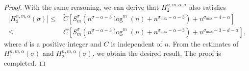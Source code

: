\documentclass[10pt]{siamltex}
\begin{document}
\begin{proof}
With the same reasoning, we can derive that ${H}_2^{n,m,\alpha,\sigma}$ also satisfies
\begin{equation*} \begin{aligned}
|{H}_2^{n,m,\alpha}(\sigma)|\leq& \widetilde{C}\left[S_m^{\sigma}\left(n^{\sigma-\alpha-3}\log^{m}(n)
+n^{\sigma_{\max}-\alpha-3}\right)+ {n}^{\sigma_{\max}-4-\alpha}\right]\\
\leq& C\left[S_m^{\sigma}\left(n^{\sigma-\alpha-3}\log^{m}(n)
+n^{\sigma_{\max}-\alpha-3}\right)+ {n}^{\sigma_{\max}-3-d-\alpha}\right],
\end{aligned}\end{equation*}
where $d$ is a positive integer and $C$ is independent of $n$.
From the estimates of ${H}_1^{n,m,\alpha}(\sigma)$ and ${H}_2^{n,m,\alpha}(\sigma)$, we obtain the desired result. The proof is completed.
\end{proof}
\end{document}
